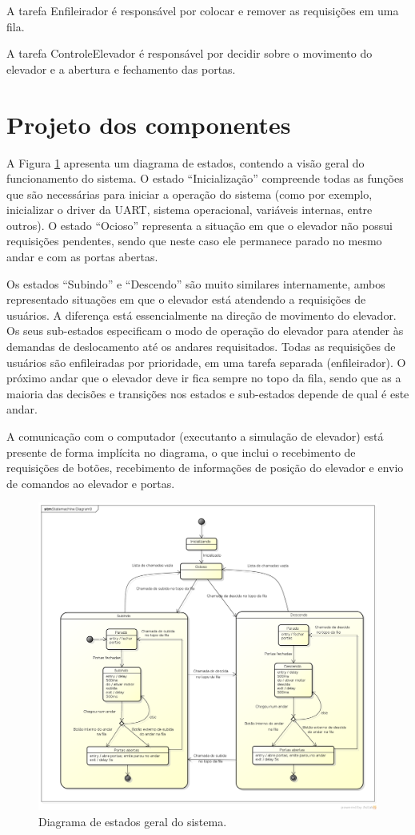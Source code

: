A tarefa Enfileirador é responsável por colocar e remover as requisições em uma fila.

A tarefa ControleElevador é responsável por decidir sobre o movimento do elevador e a abertura e fechamento das portas.

\section{Projeto dos componentes}

A Figura \ref{fig:maq_estados} apresenta um diagrama de estados, contendo a visão geral do funcionamento do sistema. O estado ``Inicialização'' compreende todas as funções que são necessárias para iniciar a operação do sistema (como por exemplo, inicializar o driver da UART, sistema operacional, variáveis internas, entre outros). O estado ``Ocioso'' representa a situação em que o elevador não possui requisições pendentes, sendo que neste caso ele permanece parado no mesmo andar e com as portas abertas. 

Os estados ``Subindo'' e ``Descendo'' são muito similares internamente, ambos representado situações em que o elevador está atendendo a requisições de usuários. A diferença está essencialmente na direção de movimento do elevador. Os seus sub-estados especificam o modo de operação do elevador para atender às demandas de deslocamento até os andares requisitados. Todas as requisições de usuários são enfileiradas por prioridade, em uma tarefa separada (enfileirador). O próximo andar que o elevador deve ir fica sempre no topo da fila, sendo que as a maioria das decisões e transições nos estados e sub-estados depende de qual é este andar.

A comunicação com o computador (executanto a simulação de elevador) está presente de forma implícita no diagrama, o que inclui o recebimento de requisições de botões, recebimento de informações de posição do elevador e envio de comandos ao elevador e portas.

\begin{figure}[h]
    \centering
    \includegraphics[width=1\columnwidth]{./figures/maq_estados.png}
    \caption{Diagrama de estados geral do sistema.}
    \label{fig:maq_estados}
\end{figure}
